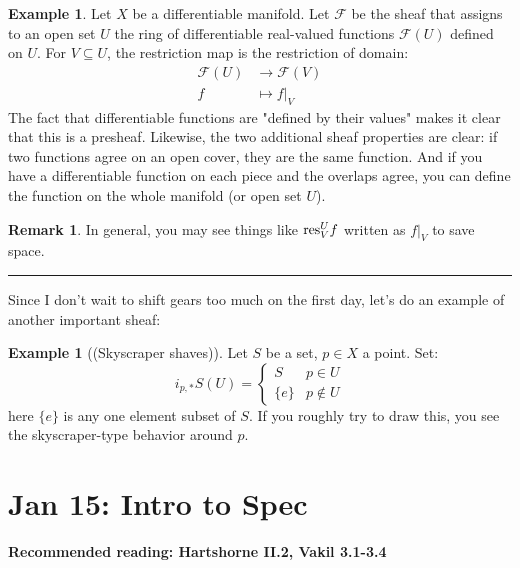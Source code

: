 \documentclass[10pt,reqno]{amsart}
\theoremstyle{definition}
\newtheorem{example}[theorem]{Example}
\newtheorem{remark}[theorem]{Remark}
\theoremstyle{remark}
\numberwithin{equation}{section}
\numberwithin{theorem}{section}
\newcommand{\res}{\textup{res}}
\newcommand{\FF}{{\mathscr F}}
\begin{document}
\begin{example} Let $X$ be a differentiable manifold. Let $\FF$ be the sheaf that assigns to an open set $U$ the ring of differentiable real-valued functions $\FF(U)$ defined on $U$. For $V \subseteq U$, the restriction map is the restriction of domain:
\begin{align*}
\FF(U) &\to \FF(V)\\
f &\mapsto f|_{V}
\end{align*}
The fact that differentiable functions are "defined by their values" makes it clear that this is a presheaf. Likewise, the two additional sheaf properties are clear: if two functions agree on an open cover, they are the same function. And if you have a differentiable function on each piece and the overlaps agree, you can define the function on the whole manifold (or open set $U$).
\end{example}

\begin{remark} In general, you may see things like $\res^U_V f$ written as $f|_V$ to save space.
\end{remark}

\hrule
\vspace{1em}

Since I don't wait to shift gears too much on the first day, let's do an example of another important sheaf:

\begin{example}[(Skyscraper shaves)] Let $S$ be a set, $p \in X$ a point. Set:
\[i_{p,*}S(U) = \begin{cases} S & p \in U \\ \{e\} & p \not\in U\end{cases}\]
here $\{e\}$ is any one element subset of $S$. If you roughly try to draw this, you see the skyscraper-type behavior around $p$.
\end{example}
\section{Jan 15: Intro to Spec}
\textbf{Recommended reading: Hartshorne II.2, Vakil 3.1-3.4}
\end{document}

